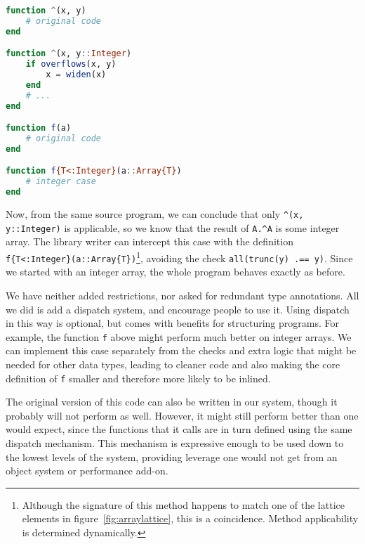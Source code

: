 \begin{singlespace}
\begin{lstlisting}[language=julia]
function ^(x, y)
    # original code
end

function ^(x, y::Integer)
    if overflows(x, y)
        x = widen(x)
    end
    # ...
end

function f(a)
    # original code
end

function f{T<:Integer}(a::Array{T})
    # integer case
end
\end{lstlisting}
\end{singlespace}

\noindent
Now, from the same source program, we can conclude that only
\texttt{\^{}(x, y::Integer)} is applicable, so we know that the
result of \texttt{A.\^{}A} is some integer array.
The library writer can intercept this case with the definition
\texttt{f\{T<:Integer\}(a::Array\{T\})}\footnote{
Although the signature of this method happens to match one of the
lattice elements in figure~\ref{fig:arraylattice}, this is a coincidence.
Method applicability is determined dynamically.
}, avoiding the check \texttt{all(trunc(y) .== y)}.
Since we started with an integer array, the whole program behaves
exactly as before.

We have neither added restrictions, nor asked for redundant type annotations.
All we did is add a dispatch system, and encourage people to use it.
Using dispatch in this way is optional, but comes with benefits for
structuring programs.
For example, the function \texttt{f} above might perform much better
on integer arrays.
We can implement this case separately from the checks and extra logic
that might be needed for other data types, leading to cleaner code
and also making the core definition of \texttt{f} smaller and therefore
more likely to be inlined.


The original version of this code can also be written in our system,
though it probably will not perform as well.
However, it might still perform better than one would expect, since the
functions that it calls are in turn defined using the same dispatch
mechanism.
This mechanism is expressive enough to be used down to the lowest levels of
the system, providing leverage one would not get from an object system
or performance add-on.

